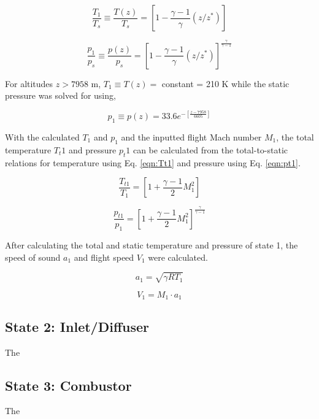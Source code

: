 \documentclass[conf]{new-aiaa} %
\begin{document}
\begin{equation}
    \label{eqn:T1}
    \frac{T_1}{T_s}\equiv\frac{T(z)}{T_s}=\left[1-\frac{\gamma-1}{\gamma}(z/z^*)\right]
\end{equation}

\begin{equation}
    \label{eqn:p1}
    \frac{p_1}{p_s}\equiv\frac{p(z)}{p_s}=\left[1-\frac{\gamma-1}{\gamma}(z/z^*)\right]^\frac{\gamma}{\gamma-1}
\end{equation}

For altitudes $z>7958$ m, $T_1\equiv T(z)=$ constant = 210 K while the static pressure was solved for using,

\begin{equation}
    \label{eqn:p1}
    p_1\equiv p(z)=33.6e^{-\left[\frac{z-7958}{6605}\right]}
\end{equation}

With the calculated $T_1$ and $p_1$ and the inputted flight Mach number $M_1$, the total temperature $T_t1$ and pressure $p_t1$ can be calculated from the total-to-static relations for temperature using Eq. \ref{eqn:Tt1} and pressure using Eq. \ref{eqn:pt1}.

\begin{equation}
    \label{eqn:Tt1}
    \frac{T_{t1}}{T_1}=\left[1+\frac{\gamma-1}{2}M_1^2\right]
\end{equation}

\begin{equation}
    \label{eqn:pt1}
    \frac{p_{t1}}{p_1}=\left[1+\frac{\gamma-1}{2}M_1^2\right]^\frac{\gamma}{\gamma-1}
\end{equation}

After calculating the total and static temperature and pressure of state 1, the speed of sound $a_1$ and flight speed $V_1$ were calculated.

\begin{equation}
    \label{eqn:a1}
    a_1=\sqrt{\gamma RT_1}
\end{equation}

\begin{equation}
    \label{eqh:V1}
    V_1=M_1\cdot a_1
\end{equation}

\subsection{State 2: Inlet/Diffuser}
The

\subsection{State 3: Combustor}
The
\end{document}
